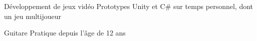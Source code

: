 


\begin{cvskills}


\cvskill
{Développement de jeux vidéo}
{Prototypes Unity et C\# sur temps personnel, dont un jeu multijoueur}


\cvskill
{Guitare}
{Pratique depuis l'âge de 12 ans}


\end{cvskills}
